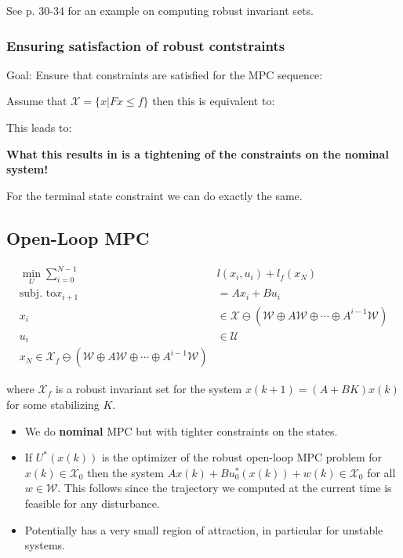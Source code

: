 \documentclass[8pt,a4paper]{scrartcl}
\begin{document}
\begin{multicols*}{3}
\finn

See p. 30-34 for an example on computing robust invariant sets.

\subsubsection{Ensuring satisfaction of robust contstraints}

Goal: Ensure that constraints are satisfied for the MPC sequence:


Assume that $\mathcal{X}=\{x|Fx\leq f\}$ then this is equivalent to:


This leads to:


\textbf{What this results in is a tightening of the constraints on the nominal system!}


For the terminal state constraint we can do exactly the same.

\subsection{Open-Loop MPC}

\begin{align*}
\min\limits_U\sum\limits_{i=0}^{N-1}&l(x_i,u_i)+l_f(x_N)\\
\text{subj. to} x_{i+1}&=Ax_i+Bu_i\\
x_i&\in \mathcal{X}\ominus(\mathcal{W}\oplus A\mathcal{W}\oplus\cdots\oplus A^{i-1}\mathcal{W})\\
u_i&\in\mathcal{U}\\
x_N\in\mathcal{X}_f\ominus(\mathcal{W}\oplus A\mathcal{W}\oplus\cdots\oplus A^{i-1}\mathcal{W})
\end{align*}

where $\mathcal{X}_f$ is a robust invariant set for the system $x(k+1)=(A+BK)x(k)$ for some stabilizing $K$.

\begin{itemize}
\item We do \textbf{nominal} MPC but with tighter constraints on the states. 
\item If $U^\ast(x(k))$ is the optimizer of the robust open-loop MPC problem for $x(k)\in\mathcal{X}_0$ then the system $Ax(k)+Bu_0^\ast(x(k))+w(k)\in\mathcal{X}_0$ for all $w\in\mathcal{W}$. This follows since the trajectory we computed at the current time is feasible for any disturbance.
\item Potentially has a very small region of attraction, in particular for unstable systems.
\end{itemize}


\end{multicols*}
\end{document}
